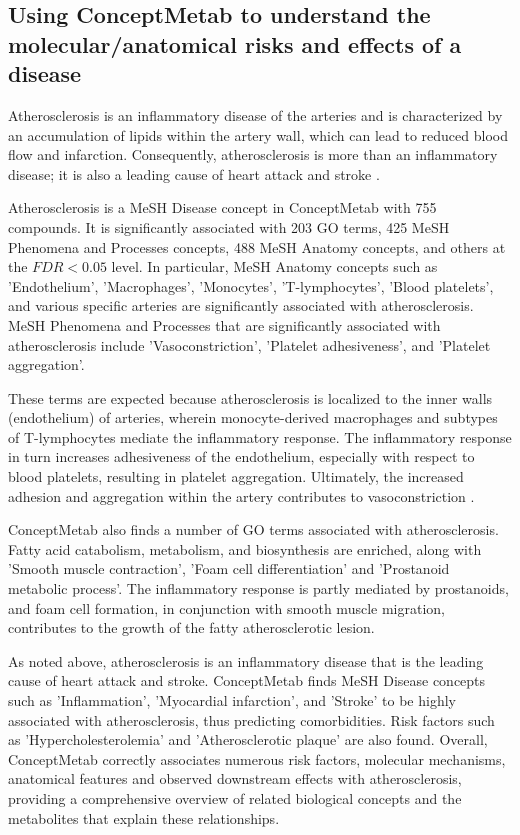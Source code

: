 \subsection{Using ConceptMetab to understand the molecular/anatomical risks and effects of a disease}
\label{conceptmetab_results_risks}

Atherosclerosis is an inflammatory disease of the arteries and is characterized by an accumulation of lipids within the artery wall, which can lead to reduced blood flow and infarction. Consequently, atherosclerosis is more than an inflammatory disease; it is also a leading cause of heart attack and stroke \cite{Ross:1993tb}.

Atherosclerosis is a MeSH Disease concept in ConceptMetab with 755 compounds. It is significantly associated with 203 GO terms, 425 MeSH Phenomena and Processes concepts, 488 MeSH Anatomy concepts, and others at the $FDR < 0.05$ level. In particular, MeSH Anatomy concepts such as 'Endothelium', 'Macrophages', 'Monocytes', 'T-lymphocytes', 'Blood platelets', and various specific arteries are significantly associated with atherosclerosis. MeSH Phenomena and Processes that are significantly associated with atherosclerosis include 'Vasoconstriction', 'Platelet adhesiveness', and 'Platelet aggregation'.

These terms are expected because atherosclerosis is localized to the inner walls (endothelium) of arteries, wherein monocyte-derived macrophages and subtypes of T-lymphocytes mediate the inflammatory response. The inflammatory response in turn increases adhesiveness of the endothelium, especially with respect to blood platelets, resulting in platelet aggregation. Ultimately, the increased adhesion and aggregation within the artery contributes to vasoconstriction \cite{Ross:1999jw}.

ConceptMetab also finds a number of GO terms associated with atherosclerosis. Fatty acid catabolism, metabolism, and biosynthesis are enriched, along with 'Smooth muscle contraction', 'Foam cell differentiation' and 'Prostanoid metabolic process'. The inflammatory response is partly mediated by prostanoids, and foam cell formation, in conjunction with smooth muscle migration, contributes to the growth of the fatty atherosclerotic lesion.

As noted above, atherosclerosis is an inflammatory disease that is the leading cause of heart attack and stroke. ConceptMetab finds MeSH Disease concepts such as 'Inflammation', 'Myocardial infarction', and 'Stroke' to be highly associated with atherosclerosis, thus predicting comorbidities. Risk factors such as 'Hypercholesterolemia' and 'Atherosclerotic plaque' are also found. Overall, ConceptMetab correctly associates numerous risk factors, molecular mechanisms, anatomical features and observed downstream effects with atherosclerosis, providing a comprehensive overview of related biological concepts and the metabolites that explain these relationships.

